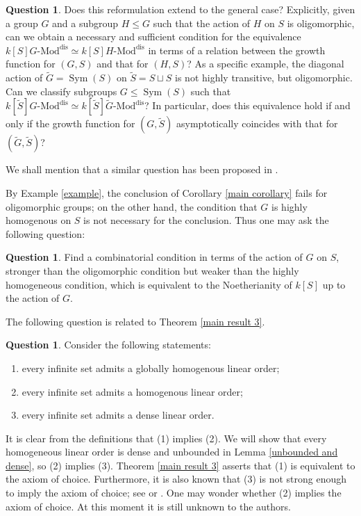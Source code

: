 \documentclass[11pt, reqno]{amsart}
\theoremstyle{plain}
\numberwithin{equation}{section}
\theoremstyle{definition}
\newtheorem{question}[theorem]{Question}
\newcommand{\Mod}{{\textrm{-}\mathrm{Mod}}}
\DeclareMathOperator{\Sym}{Sym}
\newcommand{\dis}{{\mathrm{dis}}}
\begin{document}
\begin{question}
Does this reformulation extend to the general case? Explicitly, given a group $G$ and a subgroup $H \leqslant G$ such that the action of $H$ on $S$ is oligomorphic, can we obtain a necessary and sufficient condition for the equivalence $k[S]G \Mod^{\dis} \simeq k[S]H \Mod^{\dis}$ in terms of a relation between the growth function for $(G, S)$ and that for $(H, S)$? As a specific example, the diagonal action of $\tilde{G} = \Sym(S)$ on $\tilde{S} = S \sqcup S$ is not highly transitive, but oligomorphic. Can we classify subgroups $G \leqslant \Sym(S)$ such that $k[\tilde{S}]G \Mod^{\dis} \simeq k[\tilde{S}] \tilde{G} \Mod^{\dis}$? In particular, does this equivalence hold if and only if the growth function for $(G, \tilde{S})$ asymptotically coincides with that for $(\tilde{G}, \tilde{S})$?

We shall mention that a similar question has been proposed in \cite[Remark 3.7]{LS}.
\end{question}

By Example \ref{example}, the conclusion of Corollary \ref{main corollary} fails for oligomorphic groups; on the other hand, the condition that $G$ is highly homogenous on $S$ is not necessary for the conclusion. Thus one may ask the following question:

\begin{question}
Find a combinatorial condition in terms of the action of $G$ on $S$, stronger than the oligomorphic condition but weaker than the highly homogeneous condition, which is equivalent to the Noetherianity of $k[S]$ up to the action of $G$.
\end{question}


The following question is related to Theorem \ref{main result 3}.

\begin{question}
Consider the following statements:
\begin{enumerate}
\item every infinite set admits a globally homogenous linear order;

\item every infinite set admits a homogenous linear order;

\item every infinite set admits a dense linear order.
\end{enumerate}
It is clear from the definitions that (1) implies (2). We will show that every homogeneous linear order is dense and unbounded in Lemma \ref{unbounded and dense}, so (2) implies (3). Theorem \ref{main result 3} asserts that (1) is equivalent to the axiom of choice. Furthermore, it is also known that (3) is not strong enough to imply the axiom of choice; see \cite[Theorem 1 and Corollary 13]{Gonzalez} or \cite{Pin}. One may wonder whether (2) implies the axiom of choice. At this moment it is still unknown to the authors.
\end{question}
\end{document}
